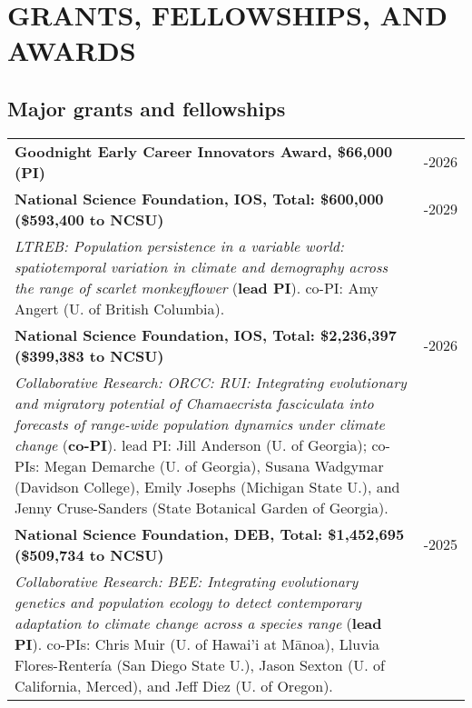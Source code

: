 \documentclass[11pt,english]{article}\usepackage[]{graphicx}\usepackage[]{xcolor}
\providecommand{\tabularnewline}{\\}
\begin{document}
\section*{GRANTS, FELLOWSHIPS, AND AWARDS}
\vspace{-0.5ex}

\subsection*{Major grants and fellowships}

\renewcommand{\arraystretch}{1.2}
\begin{tabularx}{\textwidth}{@{}>{\raggedright}p{5.25in} >{\raggedleft}X@{}}

\textbf{{Goodnight Early Career Innovators Award, \$66,000 (PI)}} & 2023-2026 \tabularnewline

\small \textbf{{National Science Foundation, IOS, Total: \$600,000} (\$593,400 to NCSU)} & 2024-2029 \tabularnewline
\addtolength{\leftskip}{5ex}\emph{LTREB: Population persistence in a variable world: spatiotemporal variation in climate and demography across the range of scarlet monkeyflower} (\textbf{lead PI}). \small{co-PI: Amy Angert (U. of British Columbia).} \tabularnewline

\small \textbf{{National Science Foundation, IOS, Total: \$2,236,397} (\$399,383 to NCSU)} & 2023-2026 \tabularnewline
\addtolength{\leftskip}{5ex}\emph{Collaborative Research: ORCC: RUI: Integrating evolutionary and migratory potential of Chamaecrista fasciculata into forecasts of range-wide population dynamics under climate change} (\textbf{co-PI}). \small{lead PI: Jill Anderson (U. of Georgia); co-PIs: Megan Demarche (U. of Georgia), Susana Wadgymar (Davidson College), Emily Josephs (Michigan State U.), and Jenny Cruse-Sanders (State Botanical Garden of Georgia).} \tabularnewline

\small \textbf{{National Science Foundation, DEB, Total: \$1,452,695} (\$509,734 to NCSU)} & 2022-2025 \tabularnewline
\addtolength{\leftskip}{5ex}\emph{Collaborative Research: BEE: Integrating evolutionary genetics and population ecology to detect contemporary adaptation to climate change across a species range} (\textbf{lead PI}). \small{co-PIs: Chris Muir (U. of Hawai'i at M\={a}noa), Lluvia Flores-Renter\'{i}a (San Diego State U.), Jason Sexton (U. of California, Merced), and Jeff Diez (U. of Oregon).} \tabularnewline


\end{tabularx}
\end{document}
